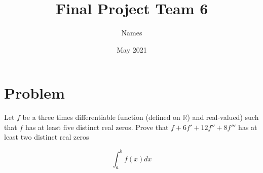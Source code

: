 \documentclass{article}
\title{Final Project Team 6}
\author{Names}
\date{May 2021}
\begin{document}
    \maketitle

    \section*{Problem}
    Let $f$ be a three times differentiable function (defined on $\mathbb{R}$)
    and real-valued) such that $f$ has at least five distinct real zeros. 
    Prove that $f + 6f' + 12f'' + 8f'''$ has at least two distinct real zeros

    $$ 
    \int_a^bf(x)dx
    $$
\end{document}

